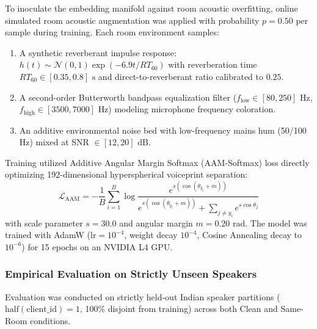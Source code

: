 \documentclass[11pt,a4paper]{article}
\begin{document}
To inoculate the embedding manifold against room acoustic overfitting, online simulated room acoustic augmentation was applied with probability $p=0.50$ per sample during training. Each room environment samples:
\begin{enumerate}
    \item A synthetic reverberant impulse response: $h(t) \sim \mathcal{N}(0, 1) \exp(-6.9 t / RT_{60})$ with reverberation time $RT_{60} \in [0.35, 0.8]\text{ s}$ and direct-to-reverberant ratio calibrated to $0.25$.
    \item A second-order Butterworth bandpass equalization filter ($f_{\text{low}} \in [80, 250]\text{ Hz}$, $f_{\text{high}} \in [3500, 7000]\text{ Hz}$) modeling microphone frequency coloration.
    \item An additive environmental noise bed with low-frequency mains hum (50/100 Hz) mixed at SNR $\in [12, 20]\text{ dB}$.
\end{enumerate}

Training utilized Additive Angular Margin Softmax (AAM-Softmax) loss \cite{deng2019arcface} directly optimizing 192-dimensional hyperspherical voiceprint separation:
\begin{equation}
\mathcal{L}_{\text{AAM}} = -\frac{1}{B}\sum_{i=1}^{B} \log \frac{e^{s(\cos(\theta_{y_i} + m))}}{e^{s(\cos(\theta_{y_i} + m))} + \sum_{j \neq y_i} e^{s \cos \theta_j}}
\end{equation}
with scale parameter $s = 30.0$ and angular margin $m = 0.20\text{ rad}$. The model was trained with AdamW ($\text{lr} = 10^{-4}$, weight decay $10^{-4}$, Cosine Annealing decay to $10^{-6}$) for 15 epochs on an NVIDIA L4 GPU.

\subsubsection{Empirical Evaluation on Strictly Unseen Speakers}
Evaluation was conducted on strictly held-out Indian speaker partitions ($\text{half}(\text{client\_id}) = 1$, 100\% disjoint from training) across both Clean and Same-Room conditions.
\end{document}

